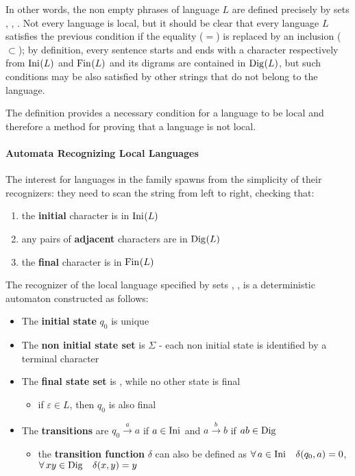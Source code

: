 \documentclass[english]{article}
\begin{document}
\bigskip
In other words, the non empty phrases of language \(L\) are defined precisely by sets \Ini, \Fin, \Dig.
Not every language is local, but it should be clear that every language \(L\) satisfies the previous condition if the equality (\(=\)) is replaced by an inclusion (\(\subset\));
by definition, every sentence starts and ends with a character respectively from \(\text{Ini}\hspace{0.1ex}(L)\) and \(\text{Fin}\hspace{0.1ex}(L)\) and its digrams are contained in \(\text{Dig}\hspace{0.1ex}(L)\), but such conditions may be also satisfied by other strings that do not belong to the language.

The definition provides a necessary condition for a language to be local and therefore a method for proving that a language is not local.

\paragraph{Automata Recognizing Local Languages}

The interest for languages in the \LOC family spawns from the simplicity of their recognizers:
they need to scan the string from left to right, checking that:

\begin{enumerate}
  \item the \textbf{initial} character is in \(\text{Ini}\hspace{0.1ex}(L)\)
  \item any pairs of \textbf{adjacent} characters are in \(\text{Dig}\hspace{0.1ex}(L)\)
  \item the \textbf{final} character is in \(\text{Fin}\hspace{0.1ex}(L)\)
\end{enumerate}

\bigskip
The recognizer of the local language specified by sets \Ini, \Fin, \Dig is a deterministic automaton constructed as follows:

\begin{itemize}
  \item The \textbf{initial state} \(q_0\) is unique
  \item The \textbf{non initial state set} is \(\Sigma\) - each non initial state is identified by a terminal character
  \item The \textbf{final state set} is \Fin, while no other state is final
        \begin{itemize}[label=\(\rightarrow\)]
          \item if \(\varepsilon \in L\), then \(q_0\) is also final
        \end{itemize}
  \item The \textbf{transitions} are \(q_0 \xrightarrow{a} a\) if \(a \in \text{Ini}\hspace{0.1ex}\) and \(a \xrightarrow{b} b\) if \(ab \in \text{Dig}\hspace{0.1ex}\)
        \begin{itemize}[label=\(\rightarrow\)]
          \item the \textbf{transition function} \(\delta\) can also be defined as \(\forall \, a \in \text{Ini}\hspace{0.1ex} \quad \delta(q_0, a) = 0\), \(\forall \, xy \in \text{Dig}\hspace{0.1ex} \quad \delta(x, y) = y\)
        \end{itemize}
\end{itemize}
\end{document}
